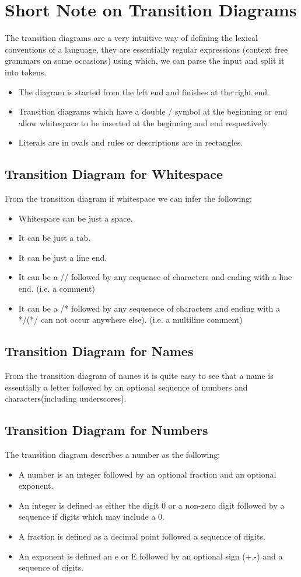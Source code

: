 \documentclass[12pt]{article}
\begin{document}
\section{Short Note on Transition Diagrams}
The transition diagrams are a very intuitive way of defining the lexical conventions of a language, they are essentially regular expressions (context free grammars on some occasions) using which, we can parse the input and split it into tokens.\\
\begin{itemize}
\item The diagram is started from the left end and finishes at the right end.
\item Transition diagrams which have a double / symbol at the beginning or end allow whitespace to be inserted at the beginning and end respectively.
\item Literals are in ovals and rules or descriptions are in rectangles.
\end{itemize}
\subsection{Transition Diagram for Whitespace}
From the transition diagram if whitespace we can infer the following:
\begin{itemize}
\item Whitespace can be just a space.
\item It can be just a tab.
\item It can be just a line end.
\item It can be a // followed by any sequence of characters and ending with a line end. (i.e. a comment)
\item It can be a /* followed by any sequenece of characters and ending with a */(*/ can not occur anywhere else). (i.e. a multiline comment)
\end{itemize}
\subsection{Transition Diagram for Names}
From the transition diagram of names it is quite easy to see that a name is essentially a letter followed by an optional sequence of numbers and characters(including underscores).
\subsection{Transition Diagram for Numbers}
The transition diagram describes a number as the following:
\begin{itemize}
\item A number is an integer followed by an optional fraction and an optional exponent.
\item An integer is defined as either the digit 0 or a non-zero digit followed by a sequence if digits which may include a 0.
\item A fraction is defined as a decimal point followed a sequence of digits.
\item An exponent is defined an e or E followed by an optional sign (+,-) and a sequence of digits.
\end{itemize}
\end{document}
